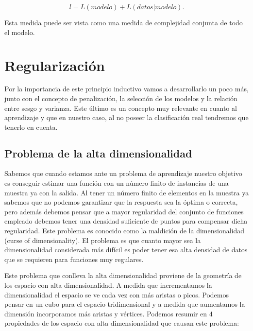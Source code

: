 $$l = L(modelo) + L(datos | modelo).$$

Esta medida puede ser vista como una medida de complejidad conjunta de todo el modelo.

\section{Regularización}

Por la importancia de este principio inductivo vamos a desarrollarlo un poco más, junto con el concepto de penalización, la selección de los modelos y la relación entre sesgo y varianza. Este último es un concepto muy relevante en cuanto al aprendizaje y que en nuestro caso, al no poseer la clasificación real tendremos que tenerlo en cuenta.

\subsection{Problema de la alta dimensionalidad}

Sabemos que cuando estamos ante un problema de aprendizaje nuestro objetivo es conseguir estimar una función con un número finito de instancias de una muestra ya con la salida. Al tener un número finito de elementos en la muestra ya sabemos que no podemos garantizar que la respuesta sea la óptima o correcta, pero además debemos pensar que a mayor regularidad del conjunto de funciones empleado debemos tener una densidad suficiente de puntos para compensar dicha regularidad. Este problema es conocido como la maldición de la dimensionalidad (curse of dimensionality). El problema es que cuanto mayor sea la dimensionalidad considerada más difícil es poder tener esa alta densidad de datos que se requieren para funciones muy regulares.

Este problema que conlleva la alta dimensionalidad proviene de la geometría de los espacio con alta dimensionalidad. A medida que incrementamos la dimensionalidad el espacio se ve cada vez con más aristas o picos. Podemos pensar en un cubo para el espacio tridimensional y a medida que aumentamos la dimensión incorporamos más aristas y vértices. Podemos resumir en 4 propiedades de los espacio con alta dimensionalidad que causan este problema:

